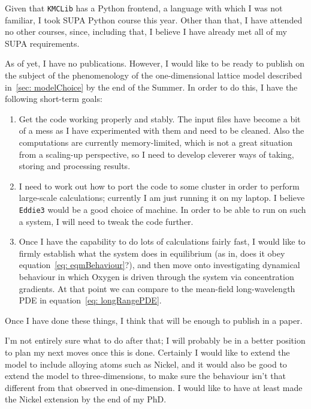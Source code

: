 Given that \texttt{KMCLib} has a Python frontend, a language with which I was not familiar, I took SUPA Python course this year. Other than that, I have attended no other courses, since, including that,
I believe I have already met all of my SUPA requirements.

As of yet, I have no publications. However, I would like to be ready to publish on the subject of the phenomenology of the one-dimensional lattice model described in~\ref{sec: modelChoice} by the end of the Summer.
In order to do this, I have the following short-term goals:
\begin{enumerate}
 \item Get the code working properly and stably. The input files have become a bit of a mess as I have experimented with them and need to be cleaned. Also the computations are currently memory-limited, which is not a great situation
 from a scaling-up perspective, so I need to develop cleverer ways of taking, storing and processing results.
 \item I need to work out how to port the code to some cluster in order to perform large-scale calculations; currently I am just running it on my laptop. I believe \texttt{Eddie3} would be a good choice of machine. In order to
 be able to run on such a system, I will need to tweak the code further.
 \item Once I have the capability to do lots of calculations fairly fast, I would like to firmly establish what the system does in equilibrium (as in, does it obey equation~\ref{eq: eqmBehaviour}?), and then move onto investigating dynamical
 behaviour in which Oxygen is driven through the system via concentration gradients. At that point we can compare to the mean-field long-wavelength PDE in equation~\ref{eq: longRangePDE}.
\end{enumerate}
Once I have done these things, I think that will be enough to publish in a paper.

I'm not entirely sure what to do after that; I will probably be in a better position to plan my next moves once this is done. Certainly I would like to extend the model to include alloying atoms such as Nickel, and it would also
be good to extend the model to three-dimensions, to make sure the behaviour isn't that different from that observed in one-dimension. I would like to have at least made the Nickel extension by the end of my PhD.